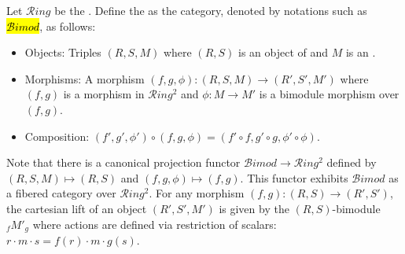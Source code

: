 \begin{definition} \label{definition:category_of_all_bimodules_over_all_rings}
    Let $\mathcal{R}ing$ be the .
    Define the  as the category, denoted by notations such as \hl{$\mathcal{B}imod$}, as follows:
\begin{itemize}
    \item Objects: Triples $(R, S, M)$ where $(R, S)$ is an object of  and $M$ is an .
    \item Morphisms: A morphism $(f, g, \phi): (R, S, M) \to (R', S', M')$ where $(f, g)$ is a morphism in $\mathcal{R}ing^2$ and $\phi: M \to M'$ is a bimodule morphism over $(f, g)$.
    \item Composition: $(f', g', \phi') \circ (f, g, \phi) = (f' \circ f, g' \circ g, \phi' \circ \phi)$.
\end{itemize}

    Note that there is a canonical projection functor $\mathcal{B}imod \to \mathcal{R}ing^2$ defined by $(R, S, M) \mapsto (R, S)$ and $(f, g, \phi) \mapsto (f, g)$. This functor exhibits $\mathcal{B}imod$ as a fibered category  over $\mathcal{R}ing^2$. For any morphism $(f, g): (R, S) \to (R', S')$, the cartesian lift of an object $(R', S', M')$ is given by the $(R, S)$-bimodule ${}_f M'_g$ where actions are defined via restriction of scalars: $r \cdot m \cdot s = f(r) \cdot m \cdot g(s)$.
\end{definition}